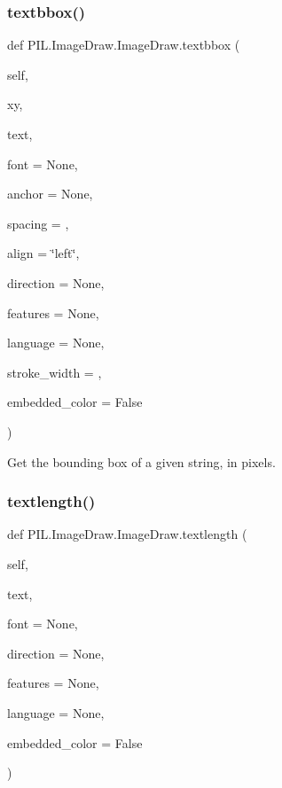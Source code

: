 \mbox{\label{classPIL_1_1ImageDraw_1_1ImageDraw_a4a3000eb5f5eec27916af4cfdcdca9f4}} 
\subsubsection{\texorpdfstring{textbbox()}{textbbox()}}
{\footnotesize\ttfamily def P\+I\+L.\+Image\+Draw.\+Image\+Draw.\+textbbox (\begin{DoxyParamCaption}\item[{}]{self,  }\item[{}]{xy,  }\item[{}]{text,  }\item[{}]{font = {\ttfamily None},  }\item[{}]{anchor = {\ttfamily None},  }\item[{}]{spacing = {},  }\item[{}]{align = {\ttfamily \char`\"{}left\char`\"{}},  }\item[{}]{direction = {\ttfamily None},  }\item[{}]{features = {\ttfamily None},  }\item[{}]{language = {\ttfamily None},  }\item[{}]{stroke\+\_\+width = {},  }\item[{}]{embedded\+\_\+color = {\ttfamily False} }\end{DoxyParamCaption})}

\begin{DoxyVerb}Get the bounding box of a given string, in pixels.\end{DoxyVerb}
 \mbox{\label{classPIL_1_1ImageDraw_1_1ImageDraw_ad9c330363e39cdc22ebd7c2207d72f6e}} 
\subsubsection{\texorpdfstring{textlength()}{textlength()}}
{\footnotesize\ttfamily def P\+I\+L.\+Image\+Draw.\+Image\+Draw.\+textlength (\begin{DoxyParamCaption}\item[{}]{self,  }\item[{}]{text,  }\item[{}]{font = {\ttfamily None},  }\item[{}]{direction = {\ttfamily None},  }\item[{}]{features = {\ttfamily None},  }\item[{}]{language = {\ttfamily None},  }\item[{}]{embedded\+\_\+color = {\ttfamily False} }\end{DoxyParamCaption})}

